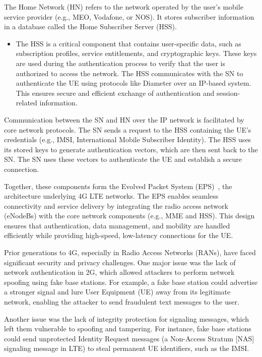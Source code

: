 The Home Network (HN) refers to the network operated by the user's mobile service provider (e.g., MEO, Vodafone, or NOS). It stores subscriber information in a database called the Home Subscriber Server (HSS).

\begin{itemize}
    \item {
        The HSS is a critical component that contains user-specific data, such as subscription profiles, service entitlements, and cryptographic keys. These keys are used during the authentication process to verify that the user is authorized to access the network. The HSS communicates with the SN to authenticate the UE using protocols like Diameter over an IP-based system. This ensures secure and efficient exchange of authentication and session-related information.
    }
\end{itemize}

Communication between the SN and HN over the IP network is facilitated by core network protocols. The SN sends a request to the HSS containing the UE’s credentials (e.g., IMSI, International Mobile Subscriber Identity). The HSS uses its stored keys to generate authentication vectors, which are then sent back to the SN. The SN uses these vectors to authenticate the UE and establish a secure connection.

Together, these components form the Evolved Packet System (EPS)~\cite{cbl-comp-4g-5g-p3}, the architecture underlying 4G LTE networks. The EPS enables seamless connectivity and service delivery by integrating the radio access network (eNodeBs) with the core network components (e.g., MME and HSS). This design ensures that authentication, data management, and mobility are handled efficiently while providing high-speed, low-latency connections for the UE.

Prior generations to 4G, especially in Radio Access Networks (RANs), have faced significant security and privacy challenges. One major issue was the lack of network authentication in 2G, which allowed attackers to perform network spoofing using fake base stations. For example, a fake base station could advertise a stronger signal and lure User Equipment (UE) away from its legitimate network, enabling the attacker to send fraudulent text messages to the user.

Another issue was the lack of integrity protection for signaling messages, which left them vulnerable to spoofing and tampering. For instance, fake base stations could send unprotected Identity Request messages (a Non-Access Stratum [NAS] signaling message in LTE) to steal permanent UE identifiers, such as the IMSI.

